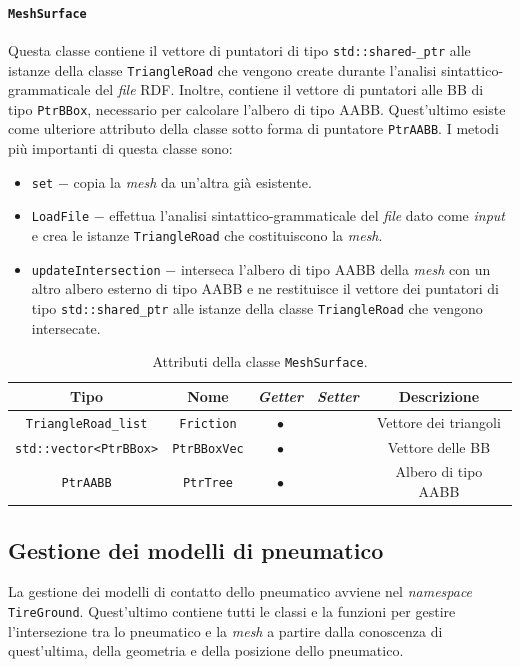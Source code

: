 \paragraph{\texttt{MeshSurface}}
Questa classe contiene il vettore di puntatori di tipo \texttt{std::shared}-\texttt{\_ptr} alle istanze della classe \texttt{TriangleRoad} che vengono create durante l'analisi sintattico-grammaticale del \textit{file} \ac{RDF}. Inoltre, contiene il vettore di puntatori alle \ac{BB} di tipo \texttt{PtrBBox}, necessario per calcolare l'albero di tipo \ac{AABB}. Quest'ultimo esiste come ulteriore attributo della classe sotto forma di puntatore \texttt{PtrAABB}. I metodi più importanti di questa classe sono:
\begin{itemize}
	\item \texttt{set} $-$ copia la \textit{mesh} da un'altra già esistente.
	\item \texttt{LoadFile} $-$ effettua l'analisi sintattico-grammaticale del \textit{file} dato come \textit{input} e crea le istanze \texttt{TriangleRoad} che costituiscono la \textit{mesh}.
	\item \texttt{updateIntersection} $-$ interseca l'albero di tipo \ac{AABB} della \textit{mesh} con un altro albero esterno di tipo \ac{AABB} e ne restituisce il vettore dei puntatori di tipo \texttt{std::shared\_ptr} alle istanze della classe \texttt{TriangleRoad} che vengono intersecate.
\end{itemize}
\begin{table}[h!]
	\centering
	\begin{tabular}{|c|c|c|c|c|}
		\hline 
		\textbf{Tipo} & \textbf{Nome} & \textit{\textbf{Getter}} & \textit{\textbf{Setter}} & \textbf{Descrizione} \\ \hline 
		\texttt{TriangleRoad\_list} & \texttt{Friction} & $\bullet$ & & Vettore dei triangoli \\ \hline
		\texttt{std::vector<PtrBBox>} & \texttt{PtrBBoxVec} & $\bullet$ & & Vettore delle \ac{BB} \\ \hline
		\texttt{PtrAABB} & \texttt{PtrTree} & $\bullet$ & & Albero di tipo \ac{AABB} \\ \hline
	\end{tabular}
	\caption{Attributi della classe \texttt{MeshSurface}.}
\end{table}
%
\subsection{Gestione dei modelli di pneumatico} 
La gestione dei modelli di contatto dello pneumatico avviene nel \textit{namespace} \texttt{TireGround}. Quest'ultimo contiene tutti le classi e la funzioni per gestire l'intersezione tra lo pneumatico e la \textit{mesh} a partire dalla conoscenza di quest'ultima, della geometria e della posizione dello pneumatico.
%

